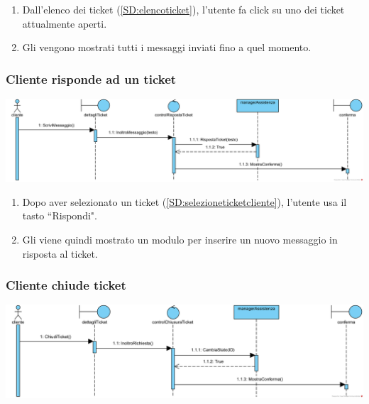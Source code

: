 \documentclass[12pt]{article}
\begin{document}
\begin{enumerate}
\item Dall'elenco dei ticket (\ref{SD:elencoticket}), l'utente fa click su uno dei ticket attualmente aperti.
\item Gli vengono mostrati tutti i messaggi inviati fino a quel momento.
\end{enumerate}

\newpage

\subsubsection{Cliente risponde ad un ticket}
\label{SD:rispostaticketcliente}

\begin{center}
\includegraphics[width=\textwidth]{SequenceDiagram/ClienteTicketRisponde}
\end{center}

\begin{enumerate}
\item Dopo aver selezionato un ticket (\ref{SD:selezioneticketcliente}), l'utente usa il tasto ``Rispondi".
\item Gli viene quindi mostrato un modulo per inserire un nuovo messaggio in risposta al ticket.
\end{enumerate}

\subsubsection{Cliente chiude ticket}
\label{SD:chiusuraticket}

\begin{center}
\includegraphics[width=\textwidth]{SequenceDiagram/ClienteTicketChiusura}
\end{center}
\end{document}
